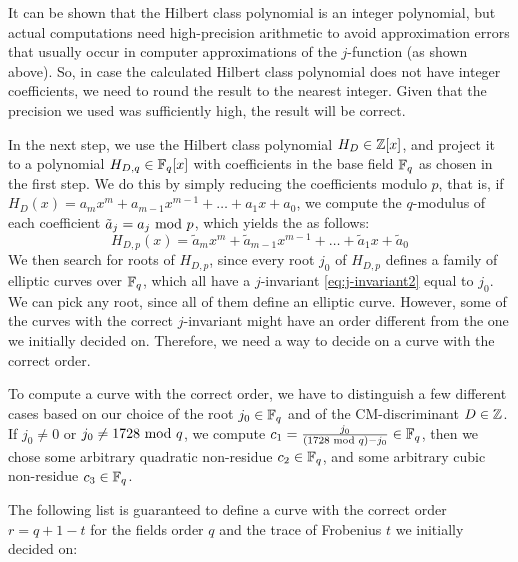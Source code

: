 It can be shown that the Hilbert class polynomial is an integer polynomial, but actual computations need high-precision arithmetic to avoid approximation errors that usually occur in computer approximations of the $j$-function (as shown above). So, in case the calculated Hilbert class polynomial does not have integer coefficients, we need to round the result to the nearest integer. Given that the precision we used was sufficiently high, the result will be correct.

In the next step, we use the Hilbert class polynomial $H_D\in \mathbb{Z}[x]$, and project it to a polynomial $H_{D,q}\in\mathbb{F}_q[x]$ with coefficients in the base field $\mathbb{F}_q$ as chosen in the first step. We do this by simply reducing the coefficients modulo $p$, that is, if $H_D(x)= a_mx^m +a_{m-1}x^{m-1}+\ldots + a_1 x + a_0$, we compute the $q$-modulus of each coefficient
$\tilde{a}_j = a_j \text{ mod } p$, which yields the  as follows:
$$
H_{D,p}(x)=\tilde{a}_mx^m +\tilde{a}_{m-1}x^{m-1}+\ldots + \tilde{a}_1 x + \tilde{a}_0
$$
We then search for roots of $H_{D,p}$, since every root $j_0$ of $H_{D,p}$ defines a family of elliptic curves over $\mathbb{F}_q$, which all have a $j$-invariant \ref{eq:j-invariant2} equal to $j_0$. We can pick any root, since all of them define an elliptic curve. However, some of the curves with the correct $j$-invariant might have an order different from the one we initially decided on. Therefore, we need a way to decide on a curve with the correct order. 

To compute a curve with the correct order, we have to distinguish a few different cases based on our choice of the root $j_0\in \mathbb{F}_q$ and of the CM-discriminant $D\in \mathbb{Z}$. If $j_0\neq 0$ or $j_0\neq 1728 \text{ mod } q$, we compute $c_1=\frac{j_0}{(1728 \text{ mod } q) -j_0}\in \mathbb{F}_q$, then we chose some arbitrary quadratic non-residue $c_2\in \mathbb{F}_q$, and some arbitrary cubic non-residue $c_3\in \mathbb{F}_q$. 

The following list is guaranteed to define a curve with the correct order $r= q+1 -t$ for the fields order $q$ and the trace of Frobenius $t$ we initially decided on:

